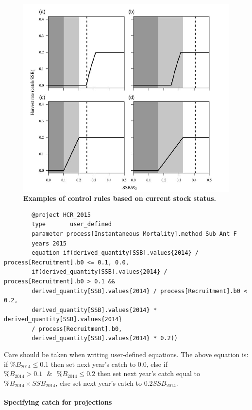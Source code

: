 \begin{figure}[!h]
	\includegraphics[scale=0.9]{Figures/HarvestControlRules.png}
	\caption{\textbf{Examples of control rules based on current stock status.}}
	\label{fig:HCR}
\end{figure}

\pagebreak
{\small{\begin{verbatim}
		@project HCR_2015
		type       user_defined
		parameter process[Instantaneous_Mortality].method_Sub_Ant_F
		years 2015
		equation if(derived_quantity[SSB].values{2014} / process[Recruitment].b0 <= 0.1, 0.0,
		if(derived_quantity[SSB].values{2014} / process[Recruitment].b0 > 0.1 &&
		derived_quantity[SSB].values{2014} / process[Recruitment].b0 < 0.2,
		derived_quantity[SSB].values{2014} * derived_quantity[SSB].values{2014}
		/ process[Recruitment].b0,
		derived_quantity[SSB].values{2014} * 0.2))
		\end{verbatim}}}

Care should be taken when writing user-defined equations. The above equation is: if $\%B_{2014} \leq 0.1$ then set next year's catch to 0.0, else if $\%B_{2014} > 0.1 \text{ } \& \text{ } \%B_{2014} \leq 0.2$ then set next year's catch equal to $\%B_{2014} \times SSB_{2014}$, else set next year's catch to $0.2 SSB_{2014}$.

\paragraph[Catches]{Specifying catch for projections }\label{sec:Project-Catch}

